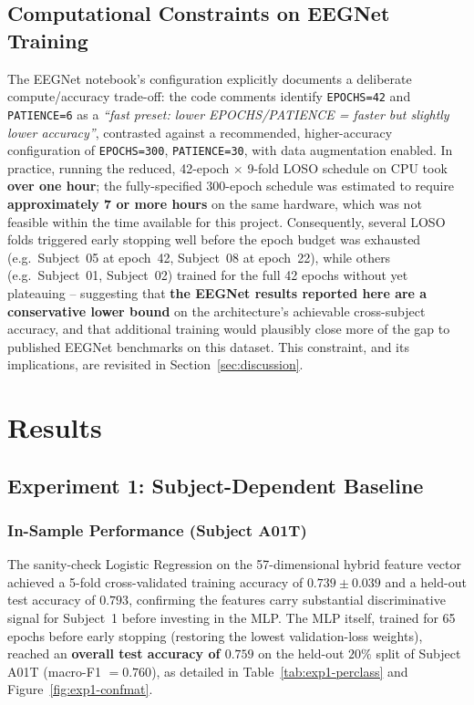 \documentclass[11pt,a4paper]{article}
\begin{document}
\subsection{Computational Constraints on EEGNet Training}
\label{sec:constraints}
The EEGNet notebook's configuration explicitly documents a deliberate compute/accuracy trade-off:
the code comments identify \texttt{EPOCHS=42} and \texttt{PATIENCE=6} as a
\emph{``fast preset: lower EPOCHS/PATIENCE = faster but slightly lower accuracy''}, contrasted
against a recommended, higher-accuracy configuration of \texttt{EPOCHS=300},
\texttt{PATIENCE=30}, with data augmentation enabled. In practice, running the reduced,
42-epoch $\times$ 9-fold LOSO schedule on CPU took \textbf{over one hour}; the fully-specified
300-epoch schedule was estimated to require \textbf{approximately 7 or more hours} on the same
hardware, which was not feasible within the time available for this project. Consequently, several
LOSO folds triggered early stopping well before the epoch budget was exhausted (e.g.\ Subject~05 at
epoch~42, Subject~08 at epoch~22), while others (e.g.\ Subject~01, Subject~02) trained for the full
42 epochs without yet plateauing -- suggesting that \textbf{the EEGNet results reported here are a
conservative lower bound} on the architecture's achievable cross-subject accuracy, and that
additional training would plausibly close more of the gap to published EEGNet benchmarks on this
dataset. This constraint, and its implications, are revisited in Section~\ref{sec:discussion}.

\section{Results}
\label{sec:results}

\subsection{Experiment 1: Subject-Dependent Baseline}
\label{sec:results-exp1}

\subsubsection{In-Sample Performance (Subject A01T)}
The sanity-check Logistic Regression on the 57-dimensional hybrid feature vector achieved a 5-fold
cross-validated training accuracy of $0.739 \pm 0.039$ and a held-out test accuracy of $0.793$,
confirming the features carry substantial discriminative signal for Subject~1 before investing in the
MLP. The MLP itself, trained for 65 epochs before early stopping (restoring the lowest validation-loss
weights), reached an \textbf{overall test accuracy of $0.759$} on the held-out $20\%$ split of Subject
A01T (macro-F1 $=0.760$), as detailed in Table~\ref{tab:exp1-perclass} and
Figure~\ref{fig:exp1-confmat}.
\end{document}
